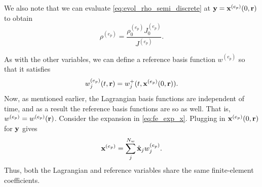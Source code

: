 \documentclass[11pt]{report}
\begin{document}
We also note that we can evaluate \cref{eq:evol_rho_semi_discrete} at $\mathbf{y} = \mathbf{x}^{(e_p)}(0,\mathbf{r})$ to obtain
\begin{equation}
    \rho^{(e_p)} = \frac{\rho^{(e_p)}_0 J^{(e_p)}_0}{J^{(e_p)}}.
\end{equation}

As with the other variables, we can define a reference basis function $w^{(e_p)}$ so that it satisfies
\begin{equation}
    w_j^{(e_p)}(t,\mathbf{r}) = w_j^+(t,\mathbf{x}^{(e_p)}(0,\mathbf{r})).
\end{equation}
Now, as mentioned earlier, the Lagrangian basis functions are independent of time, and as a result the reference basis functions are so as well. That is, $w^{(e_p)} = w^{(e_p)}(\mathbf{r})$. Consider the expansion in \cref{eq:fe_exp_x}. Plugging in $\mathbf{x}^{(e_p)}(0,\mathbf{r})$ for $\mathbf{y}$ gives
\begin{equation}
    \label{eq:re_exp_x}
    \mathbf{x}^{(e_p)} = \sum_j^{N_w} \hat{\mathbf{x}}_j w^{(e_p)}_j.
\end{equation}
Thus, both the Lagrangian and reference variables share the same finite-element coefficients.

\end{document}
